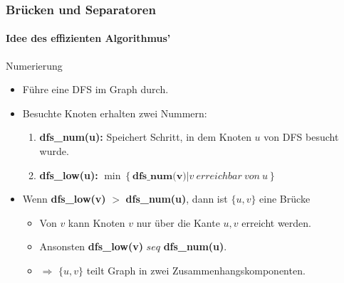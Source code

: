 \begin{frame}
\frametitle{Brücken und Separatoren}
\framesubtitle{Idee des effizienten Algorithmus'}
\begin{KITinfoblock}{Numerierung}
	\begin{itemize}
		\item Führe eine DFS im Graph durch.
		\item Besuchte Knoten erhalten zwei Nummern:
		
		\begin{enumerate}
			\item \textbf{dfs\_num(u):} Speichert Schritt, in dem Knoten $u$ von DFS besucht wurde.
			\item \textbf{dfs\_low(u):}  $\min \left \{\textbf{dfs\_num(v)} | v \ erreichbar \ von \ u \right \}$
		\end{enumerate}
	\end{itemize}
\end{KITinfoblock}
\pause
			\begin{itemize}	

		\item Wenn \textbf{dfs\_low(v)} $>$ \textbf{dfs\_num(u)}, dann ist $\{u,v\}$ eine Brücke
		\begin{itemize}
			\item Von $v$ kann Knoten $v$ nur über die Kante ${u,v}$ erreicht werden.
			\item Ansonsten \textbf{dfs\_low(v)} $seq$ \textbf{dfs\_num(u)}.
			\item $\Rightarrow$ $\{u,v\}$ teilt Graph in zwei Zusammenhangskomponenten.
		\end{itemize} 
	\end{itemize}
\end{frame}
